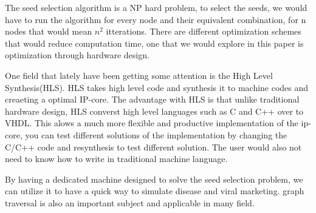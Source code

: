 The seed selection algorithm is a NP hard problem, to select the seeds, we would have to run the algorithm for every node and their equivalent combination, for n nodes that would mean $n^2$ itterations. There are different optimization schemes that would reduce computation time, one that we would explore in this paper is optimization through hardware design. 

One field that lately have been getting some attention is the High Level Synthesis(HLS).  HLS takes high level code and synthesis it to machine codes and creaeting a optimal IP-core. The advantage with HLS is that unlike traditional hardware design, HLS converst high level languages such as C and C++ over to VHDL. This alows a much more flexible and productive implementation of the ip-core, you can test different solutions of the implementation by changing the C/C++ code and resynthesis to test different solution. The user would also not need to know how to write in traditional machine language. 

By having a dedicated machine designed to solve the seed selection problem, we can utilize it to have a quick way to simulate disease and viral marketing. graph traversal is also an important subject and applicable in many field.